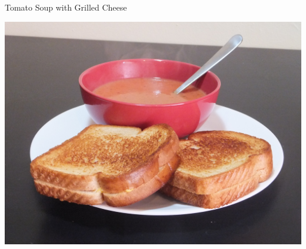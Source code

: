 \documentclass{recipe}
\begin{document}
\begin{recipe}{Tomato Soup with Grilled Cheese}

  \begin{ingredients}
  \end{ingredients}

  \begin{images}
    \begin{image}
      \includegraphics[width=0.9\linewidth]{grilled_cheese_tomato-01.jpeg}
    \end{image}
  \end{images}


\end{recipe}
\end{document}
